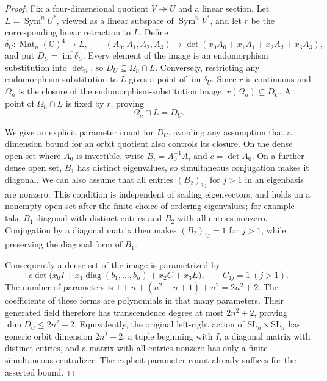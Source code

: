 \begin{proof}
Fix a four-dimensional quotient $V\twoheadrightarrow U$ and a linear
section. Let $L=\operatorname{Sym}^n U^*$, viewed as a linear subspace
of $\operatorname{Sym}^n V^*$, and let $r$ be the corresponding
linear retraction to $L$. Define
\[
 \delta_U:\operatorname{Mat}_n(\mathbb C)^4\longrightarrow L,
 \qquad (A_0,A_1,A_2,A_3)\longmapsto
                   \det(x_0A_0+x_1A_1+x_2A_2+x_3A_3),
\]
and put $D_U=\overline{\operatorname{im}\delta_U}$.
Every element of the image is an endomorphism substitution into
$\det_n$, so $D_U\subseteq\Omega_n\cap L$.
Conversely, restricting any endomorphism substitution to $L$ gives
a point of $\operatorname{im}\delta_U$. Since $r$ is continuous and
$\Omega_n$ is the closure of the endomorphism-substitution image,
$r(\Omega_n)\subseteq D_U$. A point of $\Omega_n\cap L$ is fixed by
$r$, proving
\[
                         \Omega_n\cap L=D_U.            \tag{O-008.2}
\]

We give an explicit parameter count for $D_U$, avoiding any assumption
that a dimension bound for an orbit quotient also controls its closure.
On the dense open set where $A_0$ is invertible, write
$B_i=A_0^{-1}A_i$ and $c=\det A_0$. On a further dense open set,
$B_1$ has distinct eigenvalues, so simultaneous conjugation makes it
diagonal. We can also assume that all entries $(B_2)_{1j}$ for
$j>1$ in an eigenbasis are nonzero. This condition is independent of
scaling eigenvectors, and holds on a nonempty open set after the
finite choice of ordering eigenvalues; for example take $B_1$
diagonal with distinct entries and $B_2$ with all entries nonzero.
Conjugation by a diagonal matrix then makes
$(B_2)_{1j}=1$ for $j>1$, while preserving the diagonal form of $B_1$.

Consequently a dense set of the image is parametrized by
\[
 c\det\bigl(x_0 I+x_1\operatorname{diag}(b_1,\ldots,b_n)
                                      +x_2 C+x_3 E\bigr),
 \qquad C_{1j}=1\ (j>1).
\]
The number of parameters is
$1+n+(n^2-n+1)+n^2=2n^2+2$.
The coefficients of these forms are polynomials in that many
parameters. Their generated field therefore has transcendence degree
at most $2n^2+2$, proving
$\dim D_U\leq2n^2+2$.
Equivalently, the original left-right action of
$\mathrm{SL}_n\times\mathrm{SL}_n$ has generic orbit dimension
$2n^2-2$: a tuple beginning with $I$, a diagonal matrix with distinct
entries, and a matrix with all entries nonzero has only a finite
simultaneous centralizer. The explicit parameter count already
suffices for the asserted bound.


\end{proof}
